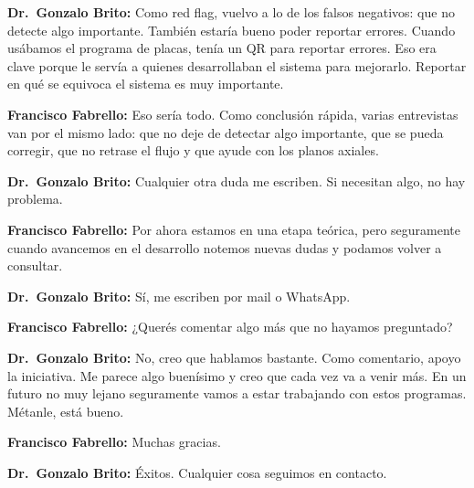 \noindent\textbf{Dr.~Gonzalo Brito:} Como red flag, vuelvo a lo de los falsos negativos: que no detecte algo importante. También estaría bueno poder reportar errores. Cuando usábamos el programa de placas, tenía un QR para reportar errores. Eso era clave porque le servía a quienes desarrollaban el sistema para mejorarlo. Reportar en qué se equivoca el sistema es muy importante.

\noindent\textbf{Francisco Fabrello:} Eso sería todo. Como conclusión rápida, varias entrevistas van por el mismo lado: que no deje de detectar algo importante, que se pueda corregir, que no retrase el flujo y que ayude con los planos axiales.

\noindent\textbf{Dr.~Gonzalo Brito:} Cualquier otra duda me escriben. Si necesitan algo, no hay problema.

\noindent\textbf{Francisco Fabrello:} Por ahora estamos en una etapa teórica, pero seguramente cuando avancemos en el desarrollo notemos nuevas dudas y podamos volver a consultar.

\noindent\textbf{Dr.~Gonzalo Brito:} Sí, me escriben por mail o WhatsApp.

\noindent\textbf{Francisco Fabrello:} ¿Querés comentar algo más que no hayamos preguntado?

\noindent\textbf{Dr.~Gonzalo Brito:} No, creo que hablamos bastante. Como comentario, apoyo la iniciativa. Me parece algo buenísimo y creo que cada vez va a venir más. En un futuro no muy lejano seguramente vamos a estar trabajando con estos programas. Métanle, está bueno.

\noindent\textbf{Francisco Fabrello:} Muchas gracias.

\noindent\textbf{Dr.~Gonzalo Brito:} Éxitos. Cualquier cosa seguimos en contacto.
